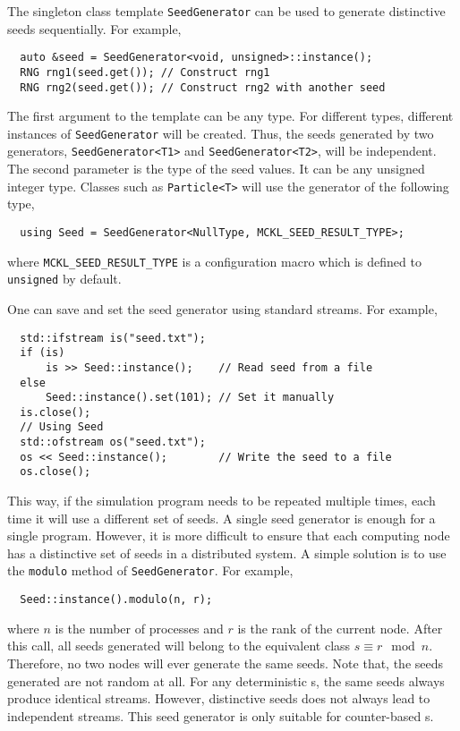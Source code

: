 The singleton class template \verb|SeedGenerator| can be used to generate
distinctive seeds sequentially. For example,
\begin{Verbatim}
  auto &seed = SeedGenerator<void, unsigned>::instance();
  RNG rng1(seed.get()); // Construct rng1
  RNG rng2(seed.get()); // Construct rng2 with another seed
\end{Verbatim}
The first argument to the template can be any type. For different types,
different instances of \verb|SeedGenerator| will be created. Thus, the seeds
generated by two generators, \verb|SeedGenerator<T1>| and
\verb|SeedGenerator<T2>|, will be independent. The second parameter is the type
of the seed values. It can be any unsigned integer type. Classes such as
\verb|Particle<T>| will use the generator of the following type,
\begin{Verbatim}
  using Seed = SeedGenerator<NullType, MCKL_SEED_RESULT_TYPE>;
\end{Verbatim}
where \verb|MCKL_SEED_RESULT_TYPE| is a configuration macro which is defined to
\verb|unsigned| by default.

One can save and set the seed generator using standard streams. For example,
\begin{Verbatim}
  std::ifstream is("seed.txt");
  if (is)
      is >> Seed::instance();    // Read seed from a file
  else
      Seed::instance().set(101); // Set it manually
  is.close();
  // Using Seed
  std::ofstream os("seed.txt");
  os << Seed::instance();        // Write the seed to a file
  os.close();
\end{Verbatim}
This way, if the simulation program needs to be repeated multiple times, each
time it will use a different set of seeds. A single seed generator is enough
for a single program. However, it is more difficult to ensure that each
computing node has a distinctive set of seeds in a distributed system. A simple
solution is to use the \verb|modulo| method of \verb|SeedGenerator|. For
example,
\begin{Verbatim}
  Seed::instance().modulo(n, r);
\end{Verbatim}
where $n$ is the number of processes and $r$ is the rank of the current node.
After this call, all seeds generated will belong to the equivalent class $s
\equiv r \mod n$. Therefore, no two nodes will ever generate the same seeds.
Note that, the seeds generated are not random at all. For any deterministic
\rng{}s, the same seeds always produce identical streams. However, distinctive
seeds does not always lead to independent streams. This seed generator is only
suitable for counter-based \rng{}s.

